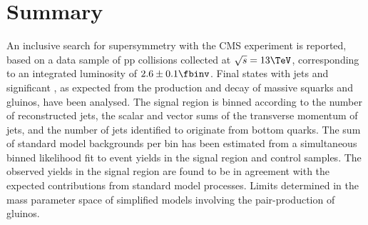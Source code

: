 \section{Summary}
\label{sec:summary}

An inclusive search for supersymmetry with the CMS experiment is
reported, based on a data sample of pp collisions collected at
$\sqrt{s} = 13\TeV$, corresponding to an integrated luminosity of $2.6
\pm 0.1 \fbinv$. Final states with jets and significant \ETmiss, as
expected from the production and decay of massive squarks and gluinos,
have been analysed. The signal region is binned according to the
number of reconstructed jets, the scalar and vector sums of the
transverse momentum of jets, and the number of jets identified to
originate from bottom quarks. The sum of standard model backgrounds
per bin has been estimated from a simultaneous binned likelihood fit
to event yields in the signal region and control samples. The observed
yields in the signal region are found to be in agreement with the
expected contributions from standard model processes. Limits %
 determined in the mass parameter space of
simplified models involving the pair-production of gluinos. 

